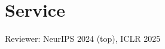 \documentclass[a4paper,20pt]{article}
\begin{document}
\section{Service}
\begin{description}[font=$\bullet$]
\item {Reviewer: NeurIPS 2024 (top), ICLR 2025}
\end{description}
\end{document}

